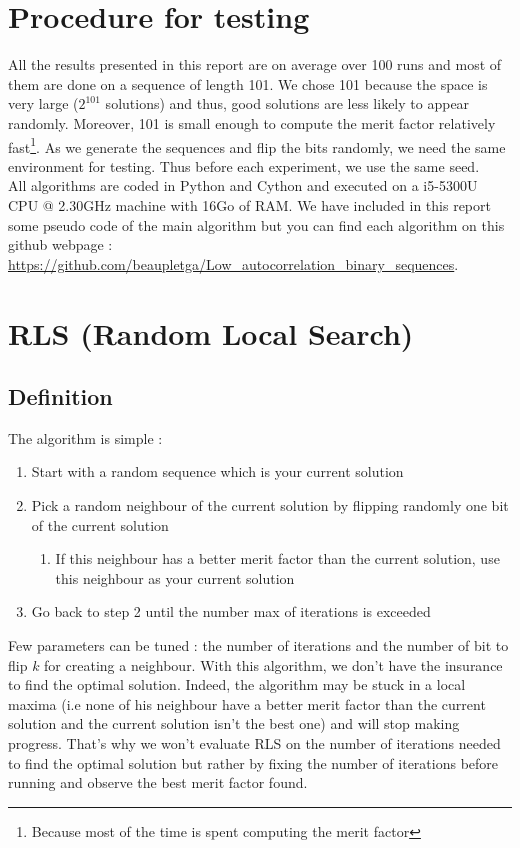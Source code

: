 \documentclass[a4paper,11pt,openany]{article}
\begin{document}
\section{Procedure for testing}
\noindent
All the results presented in this report are on average over 100 runs and most of them are done on a sequence of length 101. We chose 101 because the space is very large ($2^{101}$ solutions) and thus, good solutions are less likely to appear randomly. Moreover, 101 is small enough to compute the merit factor relatively fast\footnote{Because most of the time is spent computing the merit factor}. As we generate the sequences and flip the bits randomly, we need the same environment for testing. Thus before each experiment, we use the same seed.\\
All algorithms are coded in Python and Cython and executed on a i5-5300U CPU @ 2.30GHz machine with 16Go of RAM. We have included in this report some pseudo code of the main algorithm but you can find each algorithm on this github webpage : \url{https://github.com/beaupletga/Low_autocorrelation_binary_sequences}.
\section{RLS (Random Local Search)}
\subsection{Definition}
\noindent
The algorithm is simple \cite{rls}:
\begin{enumerate}
\item Start with a random sequence which is your current solution
\item Pick a random neighbour of the current solution by flipping randomly one bit of the current solution
\begin{enumerate}
\item If this neighbour has a better merit factor than the current solution, use this neighbour as your current solution
\end{enumerate}
\item Go back to step 2 until the number max of iterations is exceeded
\end{enumerate}
Few parameters can be tuned : the number of iterations and the number of bit to flip $k$ for creating a neighbour. With this algorithm, we don't have the insurance to find the optimal solution. Indeed, the algorithm may be stuck in a local maxima (i.e none of his neighbour have a better merit factor than the current solution and the current solution isn't the best one) and will stop making progress. That's why we won't evaluate RLS on the number of iterations needed to find the optimal solution but rather by fixing the number of iterations before running and observe the best merit factor found.
\end{document}

